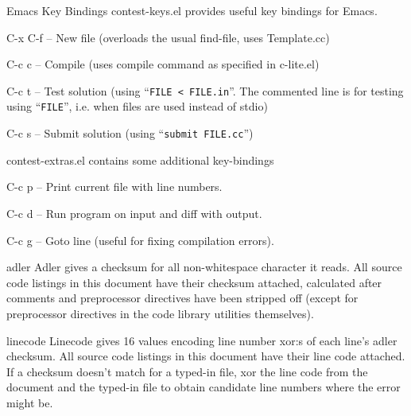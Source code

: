 \begin{algorithm}{Emacs Key Bindings}
\desc
contest-keys.el provides useful key bindings for Emacs.
\begin{description}
\item{C-x C-f} -- New file (overloads the usual find-file, uses Template.cc)
\item{C-c c} -- Compile (uses compile command as specified in c-lite.el)
\item{C-c t} -- Test solution (using ``\texttt{FILE < FILE.in}''. The
commented line is for testing using ``\texttt{FILE}'', i.e. when files
are used instead of stdio)
\item{C-c s} -- Submit solution (using ``\texttt{submit FILE.cc}'')
\end{description}
contest-extras.el contains some additional key-bindings
\begin{description}
\item{C-c p} -- Print current file with line numbers.
\item{C-c d} -- Run program on input and diff with output.
\item{C-c g} -- Goto line (useful for fixing compilation errors).
\end{description}
\end{algorithm}



\begin{algorithm}{adler}
\desc
Adler gives a checksum for all non-whitespace character it reads.
All source code listings in this document have their checksum attached,
calculated after comments and preprocessor directives have been stripped off
(except for preprocessor directives in the code library utilities themselves).
\end{algorithm}

\begin{algorithm}{linecode}
\desc
Linecode gives 16 values encoding line number xor:s of each line's adler
checksum. All source code listings in this document have their line code
attached. If a checksum doesn't match for a typed-in file, xor the line code
from the document and the typed-in file to obtain candidate line numbers where
the error might be.
\end{algorithm}

